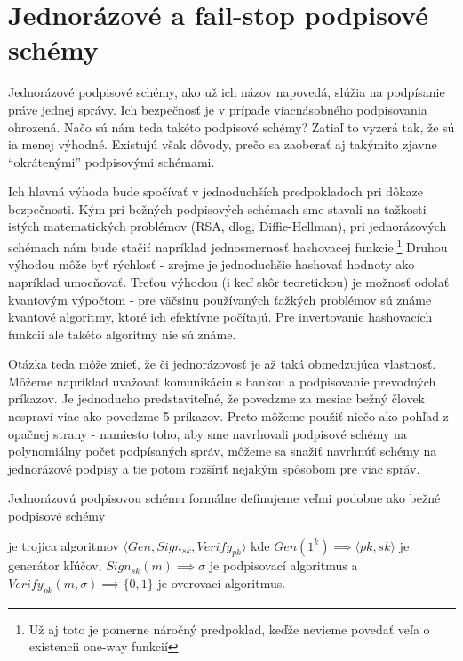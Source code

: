 \section{Jednorázové a fail-stop podpisové schémy}

Jednorázové podpisové schémy, ako už ich názov napovedá, slúžia na
podpísanie práve jednej správy. Ich bezpečnosť je v prípade viacnásobného
podpisovania ohrozená. Načo sú nám teda takéto podpisové schémy? Zatiaľ to
vyzerá tak, že sú ia menej výhodné. Existujú však dôvody, prečo sa zaoberať
aj takýmito zjavne ``okrátenými'' podpisovými schémami.

Ich hlavná výhoda bude spočívať v jednoduchších predpokladoch pri dôkaze
bezpečnosti. Kým pri bežných podpisových schémach sme stavali na
tažkosti istých matematických problémov (RSA, dlog, Diffie-Hellman),
pri jednorázových schémach nám bude stačiť napríklad jednosmernosť
hashovacej funkcie.\footnote{Už aj toto je pomerne náročný predpoklad,
    keďže nevieme povedať veľa o existencii one-way funkcií}
Druhou výhodou môže byť rýchlosť - zrejme je jednoduchšie hashovať hodnoty
ako napríklad umocňovať.
Treťou výhodou (i keď skôr teoretickou) je možnosť odolať kvantovým
výpočtom - pre väčsinu používaných ťažkých problémov sú známe kvantové
algoritmy, ktoré ich efektívne počítajú. Pre invertovanie hashovacích
funkcií ale takéto algoritmy nie sú známe.

Otázka teda môže znieť, že či jednorázovosť je až taká obmedzujúca
vlastnosť. Môžeme napríklad uvažovať komunikáciu s bankou a podpisovanie
prevodných príkazov. Je jednoducho predstaviteľné, že povedzme za mesiac
bežný človek nespraví viac ako povedzme 5 príkazov. Preto môžeme použiť
niečo ako pohľad z opačnej strany - namiesto toho, aby sme navrhovali
podpisové schémy na polynomiálny počet podpísaných správ,
môžeme sa snažiť navrhnúť schémy na jednorázové podpisy a tie potom
rozšíriť nejakým spôsobom pre viac správ.

Jednorázovú podpisovou schému formálne definujeme veľmi podobne ako bežné
podpisové schémy

\begin{definicia}
    je trojica algoritmov 
    $\langle Gen, Sign_{sk}, Verify_{pk} \rangle$ kde
    $Gen(1^k) \implies \langle pk, sk \rangle$ je generátor kľúčov,
    $Sign_{sk}(m) \implies \sigma$ je podpisovací algoritmus a
    $Verify_{pk}(m,\sigma) \implies \{0,1\}$ je overovací algoritmus.
\end{definicia}

